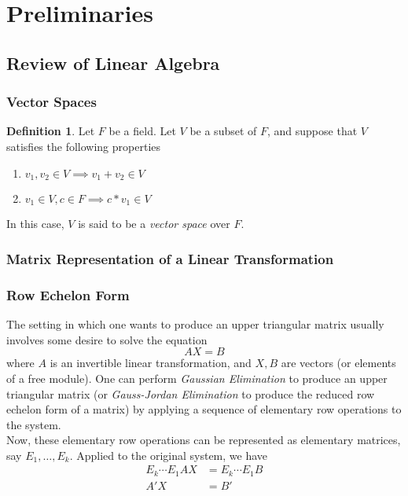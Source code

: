 \documentclass{amsart}
\theoremstyle{definition}
\newtheorem{definition}[theorem]{Definition}
\theoremstyle{remark}
\numberwithin{equation}{section}
\begin{document}
\section{Preliminaries}
\label{sec:preliminaries}

\subsection{Review of Linear Algebra}

\subsubsection{Vector Spaces}

\begin{definition}
    Let $F$ be a field. Let $V$ be a subset of $F$, and suppose that $V$
    satisfies the following properties
    \begin{enumerate}[i]
        \item $v_1, v_2 \in V \implies v_1 + v_2 \in V$
        \item $v_1 \in V, c \in F \implies c * v_1 \in V$
    \end{enumerate}
    In this case, $V$ is said to be a \emph{vector space} over $F$.
\end{definition}

\subsubsection{Matrix Representation of a Linear Transformation}

\subsubsection{Row Echelon Form}

The setting in which one wants to produce an upper triangular matrix usually involves some desire to solve the equation
    \begin{equation*}
      AX = B
    \end{equation*}
    where $A$ is an invertible linear transformation, and $X, B$ are vectors (or elements of a free module). One can perform \emph{Gaussian Elimination} to produce an upper triangular matrix (or \emph{Gauss-Jordan Elimination} to produce the reduced row echelon form of a matrix) by applying a sequence of elementary row operations to the system. \\

    Now, these elementary row operations can be represented as elementary matrices, say $E_1, \ldots, E_k$. Applied to the original system, we have
    \begin{align*}
      E_k \cdots E_1 AX &= E_k \cdots E_1 B\\
      A'X &= B'
    \end{align*}
\end{document}
